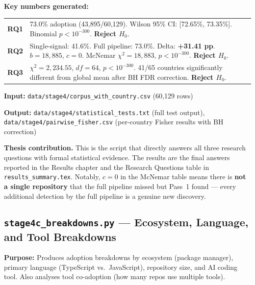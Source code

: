 \documentclass[11pt,a4paper]{article}
\begin{document}
\begin{numbersbox}
\textbf{Key numbers generated:}\\[2pt]
\begin{tabular}{@{}p{3.5cm}p{8.5cm}@{}}
\toprule
\textbf{RQ1} & 73.0\% adoption (43,895/60,129). Wilson 95\% CI: [72.65\%, 73.35\%].
               Binomial $p < 10^{-300}$. \textbf{Reject $H_0$}. \\[3pt]
\textbf{RQ2} & Single-signal: 41.6\%. Full pipeline: 73.0\%. Delta: \textbf{+31.41 pp}.
               $b = 18{,}885$, $c = 0$. McNemar $\chi^2 = 18{,}883$, $p < 10^{-300}$.
               \textbf{Reject $H_0$}. \\[3pt]
\textbf{RQ3} & $\chi^2 = 2{,}234.55$, $df = 64$, $p < 10^{-300}$.
               41/65 countries significantly different from global mean
               after BH FDR correction. \textbf{Reject $H_0$}. \\
\bottomrule
\end{tabular}
\end{numbersbox}

\textbf{Input:} \texttt{data/stage4/corpus\_with\_country.csv} (60,129 rows)

\textbf{Output:} \texttt{data/stage4/statistical\_tests.txt} (full test output),
\texttt{data/stage4/pairwise\_fisher.csv} (per-country Fisher results with BH correction)

\begin{outputbox}
\textbf{Thesis contribution.}
This is the script that directly answers all three research questions with
formal statistical evidence. The results are the final answers reported in
the Results chapter and the Research Questions table in \texttt{results\_summary.tex}.
Notably, $c = 0$ in the McNemar table means there is \textbf{not a single
repository} that the full pipeline missed but Pass~1 found --- every
additional detection by the full pipeline is a genuine new discovery.
\end{outputbox}

\newpage

\subsection*{\texttt{stage4c\_breakdowns.py} --- Ecosystem, Language, and Tool Breakdowns}

\begin{infobox}
\textbf{Purpose:} Produces adoption breakdowns by ecosystem (package manager),
primary language (TypeScript vs.\ JavaScript), repository size, and AI coding
tool. Also analyses tool co-adoption (how many repos use multiple tools).
\end{infobox}
\end{document}
